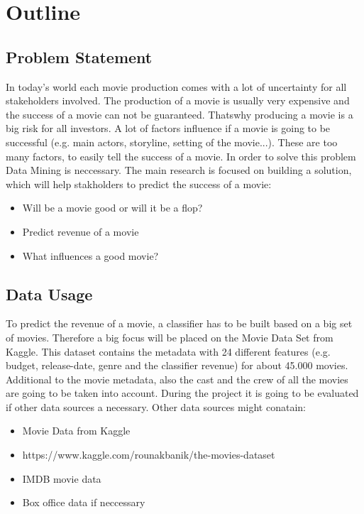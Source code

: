 \chapter{Outline}
\label{cha:intro}


 
\section{Problem Statement}
 In today's world each movie production comes with a lot of uncertainty for all stakeholders involved. The production of a movie is usually very expensive and the success of a movie can not be guaranteed. Thatswhy producing a movie is a big risk for all investors. 
A lot of factors influence if a movie is going to be successful (e.g. main actors, storyline, setting of the movie...). These are too many factors, to easily tell the success of a movie. In order to solve this problem Data Mining is neccessary. 
The main research is focused on building a solution, which will help stakholders to predict the success of a movie:

\begin{itemize}
	\item Will be a movie good or will it be a flop?
	\item Predict revenue of a movie
	\item What influences a good movie?
\end{itemize}


\section{Data Usage}
To predict the revenue of a movie, a classifier has to be built based on a big set of movies. Therefore a big focus will be placed on the Movie Data Set from Kaggle. This dataset contains the metadata with 24 different features (e.g. budget, release-date, genre and the classifier revenue) for about 45.000 movies. Additional to the movie metadata, also the cast and the crew of all the movies are going to be taken into account. During the project it is going to be evaluated if other data sources a necessary. Other data sources might conatain:

\begin{itemize}
	\item Movie Data from Kaggle
	\item https://www.kaggle.com/rounakbanik/the-movies-dataset
	\item IMDB movie data
	\item Box office data if neccessary
\end{itemize}


